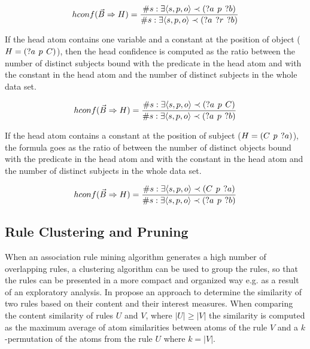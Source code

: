 $$hconf(\vec{B} \Rightarrow H) = \frac{\# s: \exists \langle s,p,o\rangle \prec (?a\hspace{0.4em}p\hspace{0.4em}?b) }{\# s: \exists \langle s,p,o\rangle \prec (?a\hspace{0.4em}?r\hspace{0.4em}?b) }$$

If the head atom contains one variable and a constant at the position of object ($H = (?a\hspace{0.4em}p\hspace{0.4em}C)$), then the head confidence is computed as the ratio between the number of distinct subjects bound with the predicate in the head atom and with the constant in the head atom and the number of distinct subjects in the whole data set.

$$hconf(\vec{B} \Rightarrow H) = \frac{\# s: \exists \langle s,p,o\rangle \prec (?a\hspace{0.4em}p\hspace{0.4em}C) }{\# s: \exists \langle s,p,o\rangle \prec (?a\hspace{0.4em}p\hspace{0.4em}?b) }$$

If the head atom contains a constant at the position of subject ($H = (C\hspace{0.4em}p\hspace{0.4em}?a)$), the formula goes as the ratio of between the number of distinct objects bound with the predicate in the head atom and with the constant in the head atom and the number of distinct subjects in the whole data set.

$$hconf(\vec{B} \Rightarrow H) = \frac{\# s: \exists \langle s,p,o\rangle \prec (C\hspace{0.4em}p\hspace{0.4em}?a) }{\# s: \exists \langle s,p,o\rangle \prec (?a\hspace{0.4em}p\hspace{0.4em}?b) }$$

\subsection{Rule Clustering and Pruning}

When an association rule mining algorithm generates a high number of overlapping rules, a clustering algorithm can be used to group the rules, so that the rules can be presented in a more compact and organized way e.g. as a result of an exploratory analysis. In \cite{Zeman2020} propose an approach to determine the similarity of two rules based on their content and their interest measures. When comparing the content similarity of rules $U$ and $V$, where $|U| \geq |V|$ the similarity is computed as the maximum average of atom similarities between atoms of the rule $V$ and a $k$-permutation of the atoms from the rule $U$ where $k = |V|$.

